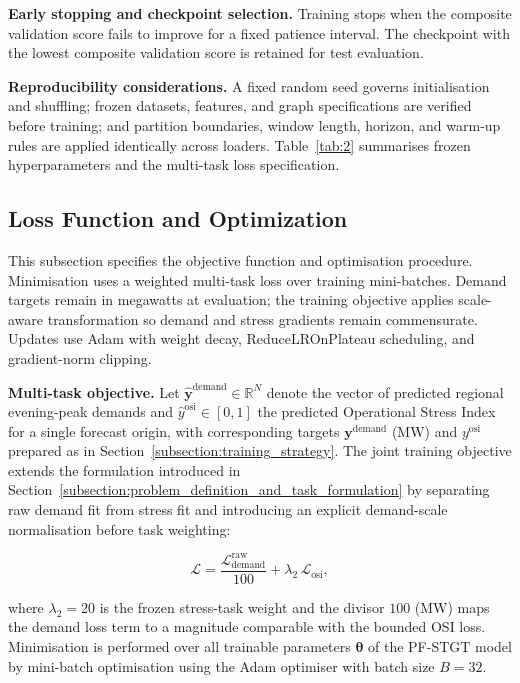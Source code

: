 \textbf{Early stopping and checkpoint selection.} Training stops when the composite validation score fails to improve for a fixed patience interval. The checkpoint with the lowest composite validation score is retained for test evaluation.

\textbf{Reproducibility considerations.} A fixed random seed governs initialisation and shuffling; frozen datasets, features, and graph specifications are verified before training; and partition boundaries, window length, horizon, and warm-up rules are applied identically across loaders. Table~\ref{tab:2} summarises frozen hyperparameters and the multi-task loss specification.

\subsection{Loss Function and Optimization}\label{subsection:loss_function_and_optimization}

This subsection specifies the objective function and optimisation procedure. Minimisation uses a weighted multi-task loss over training mini-batches. Demand targets remain in megawatts at evaluation; the training objective applies scale-aware transformation so demand and stress gradients remain commensurate. Updates use Adam with weight decay, ReduceLROnPlateau scheduling, and gradient-norm clipping.

\textbf{Multi-task objective.} Let \(\hat{\mathbf{y}}^{\mathrm{demand}} \in \mathbb{R}^N\) denote the vector of predicted regional evening-peak demands and \(\hat{y}^{\mathrm{osi}} \in [0,1]\) the predicted Operational Stress Index for a single forecast origin, with corresponding targets \(\mathbf{y}^{\mathrm{demand}}\) (MW) and \(y^{\mathrm{osi}}\) prepared as in Section~\ref{subsection:training_strategy}. The joint training objective extends the formulation introduced in Section~\ref{subsection:problem_definition_and_task_formulation} by separating raw demand fit from stress fit and introducing an explicit demand-scale normalisation before task weighting:

\[
\mathcal{L} = \frac{\mathcal{L}_{\mathrm{demand}}^{\mathrm{raw}}}{100} + \lambda_2 \, \mathcal{L}_{\mathrm{osi}},
\]

where \(\lambda_2 = 20\) is the frozen stress-task weight and the divisor \(100\) (MW) maps the demand loss term to a magnitude comparable with the bounded OSI loss. Minimisation is performed over all trainable parameters \(\boldsymbol{\theta}\) of the PF-STGT model by mini-batch optimisation using the Adam optimiser \cite{Kingma2015Adam} with batch size \(B = 32\).


